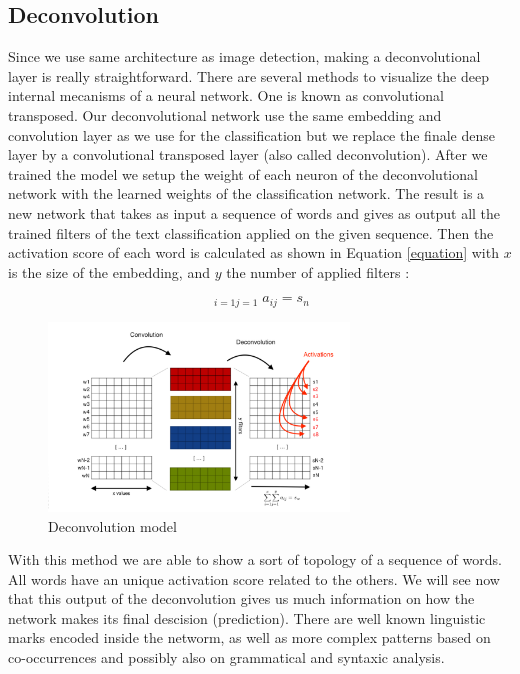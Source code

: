 \subsection{Deconvolution}

Since we use same architecture as image detection, making a deconvolutional layer is really straightforward. There are several methods to visualize the deep internal mecanisms of a neural network. One is known as convolutional transposed. Our deconvolutional network use the same embedding and convolution layer as we use for the classification but we replace the finale dense layer by a convolutional transposed layer (also called deconvolution). After we trained the model we setup the weight of each neuron of the deconvolutional network with the learned weights of the classification network. The result is a new network that takes as input a sequence of words and gives as output all the trained filters of the text classification applied on the given sequence. Then the activation score of each word is calculated as shown in Equation \ref{equation} with $x$ is the size of the embedding, and $y$ the number of applied filters : 

\begin{equation}
\mathop{\sum^{x}\sum^{y}}_{i=1  j=1}  a_{ij} = s_{n}
\label{equation}
\end{equation}

\begin{figure}[h]
\begin{center}
\includegraphics[width=8cm]{img/model_deconv.png}
\caption{Deconvolution model}
\label{cnn}
\end{center}
\end{figure}

With this method we are able to show a sort of topology of a sequence of words. All words have an unique activation score related to the others. We will see now that this output of the deconvolution gives us much information on how the network makes its final descision (prediction). There are well known linguistic marks encoded inside the networm, as well as more complex patterns based on co-occurrences and possibly also on grammatical and syntaxic analysis.
